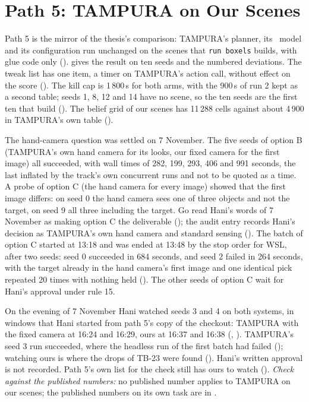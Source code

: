 \section{Path 5: TAMPURA on Our Scenes}
\label{sec:path5}

Path 5 is the mirror of the thesis's comparison: TAMPURA's planner, its
\fdice\ model and its configuration run unchanged on the scenes that \texttt{run
boxels} builds, with glue code only ().  gives the result on
ten seeds and  the numbered deviations. The
tweak list has one item, a timer on TAMPURA's action call, without effect on the
score (). The kill cap is 1\,800\,s for both arms, with the 900\,s of run 2
kept as a second table; seeds 1, 8, 12 and 14 have no scene, so the ten seeds
are the first ten that build (). The belief grid of our scenes has 11\,288
cells against about 4\,900 in TAMPURA's own table ().

The hand-camera question was settled on 7 November. The five seeds of option B
(TAMPURA's own hand camera for its looks, our fixed camera for the first image) all
succeeded, with wall times of 282, 199, 293, 406 and 991 seconds, the last inflated by
the track's own concurrent runs and not to be quoted as a time. A probe of option C
(the hand camera for every image) showed that the first image differs: on seed 0 the
hand camera sees one of three objects and not the target, on seed 9 all three including
the target. Go read Hani's words of 7 November as making option C the deliverable
(); the audit entry records Hani's decision as TAMPURA's own hand camera and
standard sensing (). The batch of option C started at 13:18 and was ended at
13:48 by the stop order for WSL, after two seeds: seed 0 succeeded in 684 seconds, and
seed 2 failed in 264 seconds, with the target already in the hand camera's first image
and one identical pick repeated 20 times with nothing held (). The other seeds of
option C wait for Hani's approval under rule 15.

On the evening of 7 November Hani watched seeds 3 and 4 on both systems, in
windows that Hani started from path 5's copy of the checkout: TAMPURA with the fixed camera
at 16:24 and 16:29, ours at 16:37 and 16:38 (,
). TAMPURA's seed 3 run succeeded, where the headless run of the first batch had
failed (); watching ours is where the drops of TB-23 were found
(). Hani's written approval is not recorded. Path 5's own list for the
check still has ours to watch ().
\emph{Check against the published numbers:} no published number applies to TAMPURA
on our scenes; the published numbers on its own task are in .

